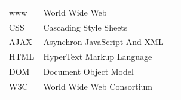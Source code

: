 \documentclass[a4paper,bibtotoc,oneside]{scrbook}
\begin{document}
\listoffigures
{} %
\newpage


\hspace{-17mm}\begin{tabular}{>{\raggedleft}p{0.2\linewidth} p{0.75\linewidth} p{0.1\linewidth}}

www & World Wide Web\\
CSS & Cascading Style Sheets\\
AJAX & Asynchron JavaScript And XML\\
HTML & HyperText Markup Language\\
DOM & Document Object Model\\
W3C & World Wide Web Consortium\\

\end{tabular}


\end{document}
